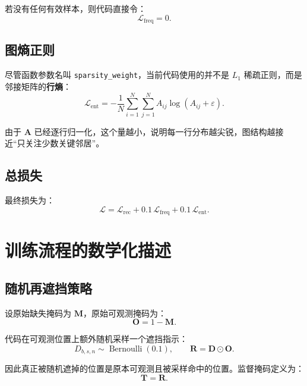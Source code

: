 \documentclass[UTF8]{ctexart}
\begin{document}
若没有任何有效样本，则代码直接令：
\begin{equation}
    \mathcal{L}_{\text{freq}} = 0.
\end{equation}

\subsection{图熵正则}

尽管函数参数名叫 \texttt{sparsity\_weight}，当前代码使用的并不是 $L_1$ 稀疏正则，而是邻接矩阵的\textbf{行熵}：
\begin{equation}
    \mathcal{L}_{\text{ent}}
    =
    -\frac{1}{N}\sum_{i=1}^{N}\sum_{j=1}^{N}A_{ij}\log(A_{ij}+\varepsilon).
\end{equation}

由于 $\bm{A}$ 已经逐行归一化，这个量越小，说明每一行分布越尖锐，图结构越接近“只关注少数关键邻居”。

\subsection{总损失}

最终损失为：
\begin{equation}
    \mathcal{L}
    =
    \mathcal{L}_{\text{rec}}
    +
    0.1\,\mathcal{L}_{\text{freq}}
    +
    0.1\,\mathcal{L}_{\text{ent}}.
\end{equation}

\section{训练流程的数学化描述}

\subsection{随机再遮挡策略}

设原始缺失掩码为 $\bm{M}$，原始可观测掩码为：
\begin{equation}
    \bm{O} = 1 - \bm{M}.
\end{equation}

代码在可观测位置上额外随机采样一个遮挡指示：
\begin{equation}
    D_{b,s,n} \sim \operatorname{Bernoulli}(0.1),
    \qquad
    \bm{R} = \bm{D} \odot \bm{O}.
\end{equation}

因此真正被随机遮掉的位置是原本可观测且被采样命中的位置。监督掩码定义为：
\begin{equation}
    \bm{T} = \bm{R}.
\end{equation}
\end{document}
